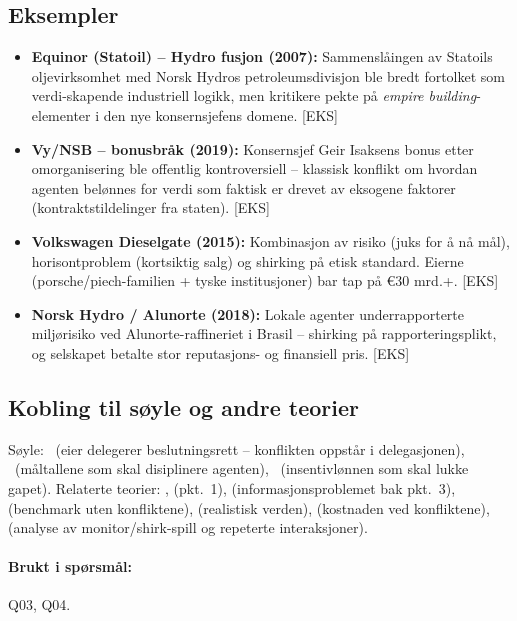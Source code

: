 \subsection*{Eksempler}
\begin{itemize}
\item \textbf{Equinor (Statoil) -- Hydro fusjon (2007):} Sammenslåingen av Statoils olje\-virksomhet med Norsk Hydros petroleums\-divisjon ble bredt fortolket som verdi-skapende industriell logikk, men kritikere pekte på \emph{empire building}-elementer i den nye konsernsjefens domene. [EKS]
\item \textbf{Vy/NSB -- bonusbråk (2019):} Konsernsjef Geir Isaksens bonus etter omorganisering ble offentlig kontroversiell -- klassisk konflikt om hvordan agenten belønnes for verdi som faktisk er drevet av eksogene faktorer (kontraktstildelinger fra staten). [EKS]
\item \textbf{Volkswagen Dieselgate (2015):} Kombinasjon av risiko (juks for å nå mål), horisontproblem (kortsiktig salg) og shirking på etisk standard. Eierne (porsche/piech-familien + tyske institusjoner) bar tap på \euro 30 mrd.+. [EKS]
\item \textbf{Norsk Hydro / Alunorte (2018):} Lokale agenter under\-rapporterte miljørisiko ved Alunorte-raffineriet i Brasil -- shirking på rapporteringsplikt, og selskapet betalte stor reputasjons- og finansiell pris. [EKS]
\end{itemize}

\subsection*{Kobling til søyle og andre teorier}
Søyle: \SOne\ (eier delegerer beslutningsrett -- konflikten oppstår i delegasjonen), \STwo\ (måltallene som skal disiplinere agenten), \SThree\ (insentivlønnen som skal lukke gapet). Relaterte teorier: ,  (pkt.\ 1),  (informasjons\-problemet bak pkt.\ 3),  (benchmark uten konfliktene),  (realistisk verden),  (kostnaden ved konfliktene),  (analyse av monitor/shirk-spill og repeterte interaksjoner).

\paragraph{Brukt i spørsmål:} Q03, Q04.
